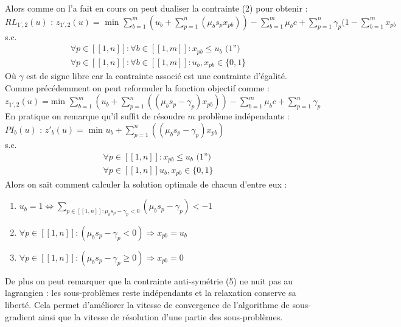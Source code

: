 \documentclass{article}
\begin{document}
Alors comme on l'a fait en cours on peut dualiser la contrainte (2) pour obtenir :\\
$RL_{1',2}(u) \text{ : } z_{1',2}(u) = \text{ min } \sum \limits_{b = 1}^{m}( u_b + \sum \limits_{p = 1}^n (\mu_b s_p x_{pb})) - \sum \limits_{b = 1}^{m} \mu_b c + \sum \limits_{p = 1}^n \gamma_p (1 - \sum \limits_{b = 1}^m x_{pb}$\\
s.c.
\begin{align*}
 \forall p \in [\![ 1 , n ]\!] : \forall b \in [\![ 1 , m ]\!] : x_{pb} \leqslant u_b \text{ (1'')}\\
 \forall p \in [\![ 1 , n ]\!] : \forall b \in [\![ 1 , m ]\!] : u_b , x_{pb} \in \{0,1\}
\end{align*}
Où $\gamma$ est de signe libre car la contrainte associé est une contrainte d'égalité.\\
Comme précédemment on peut reformuler la fonction objectif comme : \\
$z_{1',2}(u) = \text{min } \sum \limits_{b = 1}^{m}( u_b + \sum \limits_{p = 1}^n ((\mu_b s_p - \gamma_p) x_{pb})) - \sum \limits_{b = 1}^{m} \mu_b c + \sum \limits_{p = 1}^{n} \gamma_p$\\
En pratique on remarque qu'il suffit de résoudre $m$ problème indépendants :\\
$PI_{b}(u) \text{ : } z'_{b}(u) = \text{ min } u_b + \sum \limits_{p = 1}^n ((\mu_b s_p - \gamma_p) x_{pb})$\\
s.c.
\begin{align*}
 \forall p \in [\![ 1 , n ]\!] : x_{pb} \leqslant u_b \text{ (1'')}\\
 \forall p \in [\![ 1 , n ]\!] u_b , x_{pb} \in \{0,1\}
\end{align*}
Alors on sait comment calculer la solution optimale de chacun d'entre eux :
\begin{enumerate}[1 - ]
\item
$u_b = 1 \Leftrightarrow \sum \limits_{ p \in [\![ 1 , n ]\!] : \mu_b s_p - \gamma_p < 0} (\mu_b s_p - \gamma_p) < -1$
\item
$\forall p \in [\![ 1 , n ]\!] : (\mu_b s_p - \gamma_p < 0) \Rightarrow x_{pb} = u_b$
\item
$\forall p \in [\![ 1 , n ]\!] : (\mu_b s_p - \gamma_p \geqslant 0) \Rightarrow x_{pb} = 0$
\end{enumerate}

De plus on peut remarquer que la contrainte anti-symétrie (5) ne nuit pas au lagrangien : les sous-problèmes reste indépendants et la relaxation conserve sa liberté. Cela permet d'améliorer la vitesse de convergence de l'algorithme de sous-gradient ainsi que la vitesse de résolution d'une partie des sous-problèmes.
\end{document}
